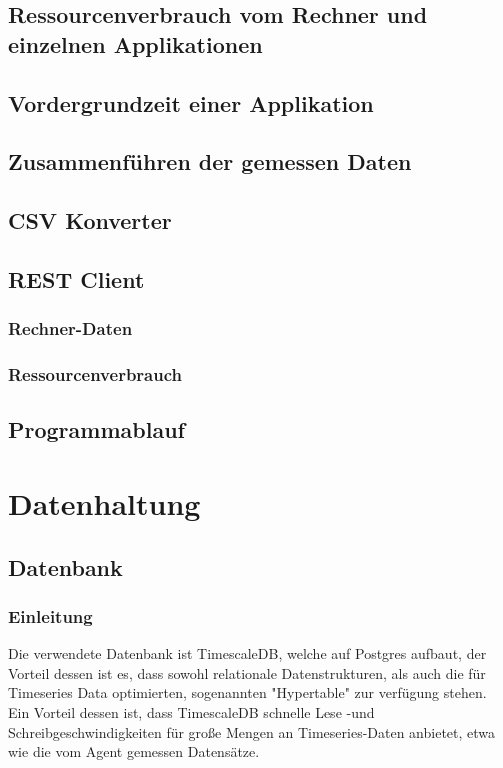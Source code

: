 \documentclass{report}
\begin{document}
\subsection{Ressourcenverbrauch vom Rechner und einzelnen Applikationen}
\subsection{Vordergrundzeit einer Applikation}
\subsection{Zusammenführen der gemessen Daten}
\subsection{CSV Konverter}
\subsection{REST Client}
\subsubsection{Rechner-Daten}
\subsubsection{Ressourcenverbrauch}
\subsection{Programmablauf}

\section{Datenhaltung}
\subsection{Datenbank}
\subsubsection{Einleitung}
Die verwendete Datenbank ist TimescaleDB, welche auf Postgres aufbaut, der Vorteil dessen ist es, dass sowohl relationale Datenstrukturen, als auch die für Timeseries Data optimierten, sogenannten "Hypertable" zur verfügung stehen. Ein Vorteil dessen ist, dass TimescaleDB schnelle Lese -und Schreibgeschwindigkeiten für große Mengen an Timeseries-Daten anbietet, etwa wie die vom Agent gemessen Datensätze.
\end{document}
